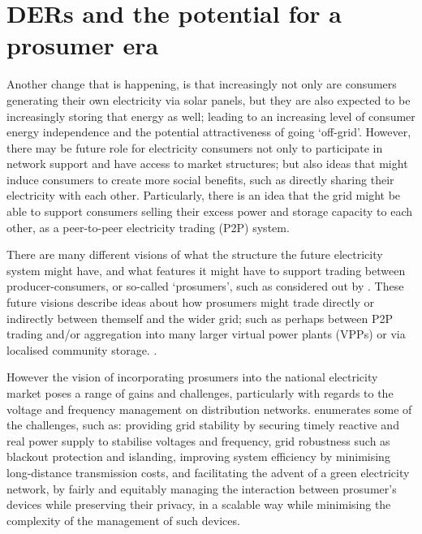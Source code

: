 \section{DERs and the potential for a prosumer era}\label{sec:intro_part13}

Another change that is happening, is that increasingly not only are consumers generating their own electricity via solar panels, but they are also expected to be increasingly storing that energy as well; leading to an increasing level of consumer energy independence and the potential attractiveness of going `off-grid'.
However, there may be future role for electricity consumers not only to participate in network support and have access to market structures; but also ideas that might induce consumers to create more social benefits, such as directly sharing their electricity with each other.
Particularly, there is an idea that the grid might be able to support consumers selling their excess power and storage capacity to each other, as a peer-to-peer electricity trading (P2P) system.

There are many different visions of what the structure the future electricity system might have, and what features it might have to support trading between producer-consumers, or so-called `prosumers', such as considered out by \cite{Parag2016}.
These future visions describe ideas about how prosumers might trade directly or indirectly between themself and the wider grid; such as perhaps between P2P trading and/or aggregation into many larger virtual power plants (VPPs) or via localised community storage. \citep{Morstyn2018}.

However the vision of incorporating prosumers into the national electricity market poses a range of gains and challenges, particularly with regards to the voltage and frequency management on distribution networks.
\cite{BELL2018765} enumerates some of the challenges, such as: providing grid stability by securing timely reactive and real power supply to stabilise voltages and frequency, grid robustness such as blackout protection and islanding, improving system efficiency by minimising long-distance transmission costs, and facilitating the advent of a green electricity network, by fairly and equitably managing the interaction between prosumer's devices while preserving their privacy, in a scalable way while minimising the complexity of the management of such devices.


